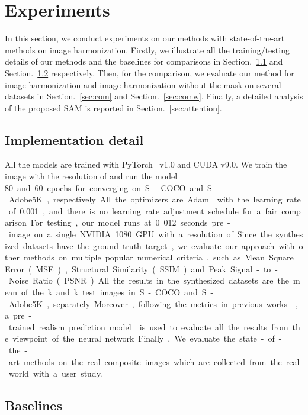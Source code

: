 \section{Experiments}
\label{sec:exp}
In this section, we conduct experiments on our methods with state-of-the-art methods on image harmonization. Firstly, we illustrate all the training/testing details of our methods and the baselines for comparisons in Section.~\ref{sec:imp} and Section.~\ref{sec:baseline} respectively. Then, for the comparison, we evaluate our method for image harmonization and image harmonization without the mask on several datasets in Section.~\ref{sec:com} and Section.~\ref{sec:comw}. Finally, a detailed analysis of the proposed SAM is reported in Section.~\ref{sec:attention}.

\subsection{Implementation detail} 
\label{sec:imp}
All the models are trained with PyTorch~\cite{paszke2017automatic} v1.0 and CUDA v9.0. We train the image with the resolution of  and run the model \SI{80} and \SI{60} epochs for converging on S-COCO and S-Adobe5K, respectively. All the optimizers are Adam~\cite{Kingma:2014us} with the learning rate of \SI{0.001}, and there is no learning rate adjustment schedule for a fair comparison. For testing, our model runs at 0.012 seconds pre-image on a single NVIDIA 1080 GPU with a resolution of .
Since the synthesized datasets have the ground truth target, we evaluate our approach with other methods on multiple popular numerical criteria, such as Mean Square Error (MSE), Structural Similarity (SSIM) and Peak Signal-to-Noise Ratio (PSNR). All the results in the synthesized datasets are the mean of the k and k test images in S-COCO and S-Adobe5K, separately. Moreover, following the metrics in previous works~\cite{Tsai:2017kv,Wu:2017wq}, a pre-trained realism prediction model~\cite{Zhu:2015tl} is used to evaluate all the results from the viewpoint of the neural network. Finally, We evaluate the state-of-the-art methods on the real composite images which are collected from the real world with a user study.

\subsection{Baselines}
\label{sec:baseline}

